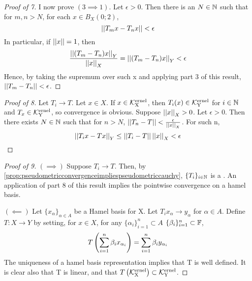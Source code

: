 \begin{prop}
\begin{proof}[Proof of 7]
    I now prove $(3 \implies 1)$. 
    Let $\epsilon > 0$.
    Then there is an $N \in \mathbb{N}$ 
    such that for $m,n>N$, 
    for each $x \in B_X(0;2)$, 
    \begin{equation*}
    \left|\left| T_mx-T_nx \right|\right| < \epsilon
    \end{equation*}
    In particular, if $\left|\left| x \right|\right|=1$, then 
    \begin{equation}
    \frac{\left|\left| (T_m-T_n)x \right|\right|_Y}{\left|\left| x \right|\right|_X} =\left|\left| (T_m-T_n)x \right|\right|_Y < \epsilon
    \end{equation}
    Hence, by taking the supremum over such x
    and applying part 3 of this result, 
    $\left|\left| T_m-T_n \right|\right| < \epsilon$. 
\end{proof}
\begin{proof}[Proof of 8]
    Let $T_i \to T$. 
    Let $x \in X$. 
    If $x \in \bf\mathcal{K}\rm^{ernel}_X$, then $T_i(x) \in \bf\mathcal{K}\rm^{ernel}_Y$ for $i \in \mathbb{N}$ and $T_x \in \bf\mathcal{K}\rm^{ernel}_Y$, 
    so convergence is obvious. 
    Suppose $\left|\left| x \right|\right|_X > 0$. 
    Let $\epsilon > 0$. 
    Then there exists $N \in \mathbb{N}$ such that
    for $n>N$, $\left|\left| T_n-T \right|\right| < \frac{\epsilon}{\left|\left| x \right|\right|_X}$.
    For such n, 
    \begin{equation*}
    \left|\left| T_ix-Tx \right|\right|_Y \leq \left|\left| T_i-T \right|\right| \left|\left| x \right|\right|_X < \epsilon
    \end{equation*}
\end{proof}
\begin{proof}[Proof of 9]
    
    $(\implies)$ 
    Suppose $T_i \to T$.
    Then, by \ref{prop:pseudometricconvergenceimpliespseudometriccauchy}, 
    $\{T_i\}_{i \in \mathbb{N}}$ is a \PseudometricCauchySequence.
    An application of part 8 of this result implies
    the pointwise convergence on a hamel basis. 


    $(\impliedby)$
    Let $\{x_\alpha\}_{\alpha \in A}$ be a Hamel basis for X. 
    Let $T_ix_\alpha \to y_\alpha$ for $\alpha \in A$. 
    Define $T: X \to Y$ by setting, for $x \in X$, 
    for any $\{\alpha_i\}_{i=1}^n \subset A$
    $\{\beta_i\}_{i=1}^n \subset \mathbb{F}$, 
    \begin{equation}
    T\left( \sum_{i=1}^n \beta_i x_{\alpha_i}\right) = \sum_{i=1}^n \beta_i y_{\alpha_i}
    \end{equation}
    The uniqueness of a hamel basis representation implies
    that T is well defined. 
    It is clear also that T is linear, 
    and that $T\left( \bf\mathcal{K}\rm^{ernel}_X\right) \subset \bf\mathcal{K}\rm^{ernel}_Y$. 


\end{proof}
\end{prop}
